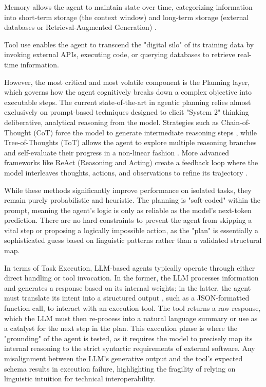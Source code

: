 Memory allows the agent to maintain state over time, categorizing information into short-term storage (the context window) and long-term storage (external databases or Retrieval-Augmented Generation) \citep{albada2025chapterMemory}. 

Tool use \citep{schick2023toolformerlanguagemodelsteach,parisi2022talmtoolaugmentedlanguage} enables the agent to transcend the "digital silo" of its training data by invoking external APIs, executing code, or querying databases to retrieve real-time information. 

However, the most critical and most volatile component is the Planning layer, which governs how the agent cognitively breaks down a complex objective into executable steps.
The current state-of-the-art in agentic planning relies almost exclusively on prompt-based techniques designed to elicit "System 2" thinking deliberative, analytical reasoning from the model. Strategies such as Chain-of-Thought (CoT) force the model to generate intermediate reasoning steps \citep{wei2023chainofthoughtpromptingelicitsreasoning}, while Tree-of-Thoughts (ToT) allows the agent to explore multiple reasoning branches and self-evaluate their progress in a non-linear fashion \citep{yao2023treethoughtsdeliberateproblem}. More advanced frameworks like ReAct (Reasoning and Acting) create a feedback loop where the model interleaves thoughts, actions, and observations to refine its trajectory \citep{yao2023reactsynergizingreasoningacting}. 

While these methods significantly improve performance on isolated tasks, they remain purely probabilistic and heuristic. The planning is "soft-coded" within the prompt, meaning the agent's logic is only as reliable as the model's next-token prediction. There are no hard constraints to prevent the agent from skipping a vital step or proposing a logically impossible action, as the "plan" is essentially a sophisticated guess based on linguistic patterns rather than a validated structural map.

In terms of Task Execution, LLM-based agents typically operate through either direct handling or tool invocation. 
In the former, the LLM processes information and generates a response based on its internal weights; in the latter, the agent must translate its intent into a structured output \citep{Liu_2024}, such as a JSON-formatted function call, to interact with an execution tool. 
The tool returns a raw response, which the LLM must then re-process into a natural language summary or use as a catalyst for the next step in the plan. 
This execution phase is where the "grounding" of the agent is tested, as it requires the model to precisely map its internal reasoning to the strict syntactic requirements of external software. 
Any misalignment between the LLM's generative output and the tool's expected schema results in execution failure, highlighting the fragility of relying on linguistic intuition for technical interoperability.



